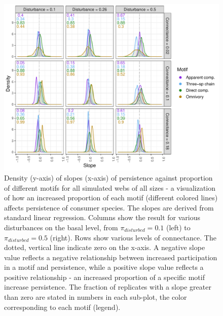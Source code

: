 \documentclass[12pt]{article}
\begin{document}
\begin{spacing}{2.0}
        \begin{figure}
            \centering
            \includegraphics[width=\textwidth]{figures/prop_dens_bp_vs_C_allS.pdf}
            \caption{Density (y-axis) of slopes (x-axis) of persistence against proportion of different motifs for all simulated webs of all sizes - a visualization of how an increased proportion of each motif (different colored lines) affects persistence of consumer species. The slopes are derived from standard linear regression. Columns show the result for various disturbances on the basal level, from $\pi_{disturbed} = 0.1$ (left) to $\pi_{disturbed} = 0.5$ (right). Rows show various levels of connectance. The dotted, vertical line indicate zero on the x-axis. A negative slope value reflects a negative relationship between increased participation in a motif and persistence, while a positive slope value reflects a positive relationship - an increased proportion of a specific motif increase persistence. The fraction of replicates with a slope greater than zero are stated in numbers in each sub-plot, the color corresponding to each motif (legend). }
            \label{fig:density_prop_C}
        \end{figure}    
    

\end{spacing}
\end{document}
